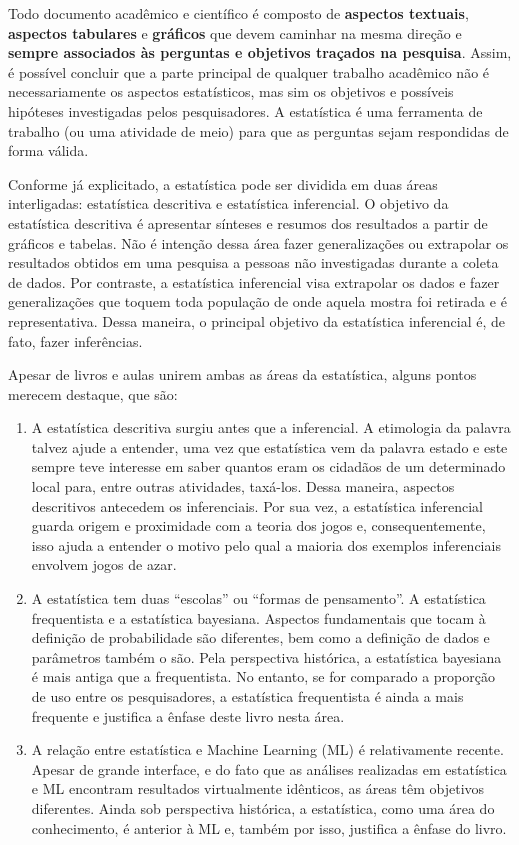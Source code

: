 \documentclass[
]{book}
\begin{document}
Todo documento acadêmico e científico é composto de \textbf{aspectos textuais}, \textbf{aspectos tabulares} e \textbf{gráficos} que devem caminhar na mesma direção e \textbf{sempre associados às perguntas e objetivos traçados na pesquisa}. Assim, é possível concluir que a parte principal de qualquer trabalho acadêmico não é necessariamente os aspectos estatísticos, mas sim os objetivos e possíveis hipóteses investigadas pelos pesquisadores. A estatística é uma ferramenta de trabalho (ou uma atividade de meio) para que as perguntas sejam respondidas de forma válida.

Conforme já explicitado, a estatística pode ser dividida em duas áreas interligadas: estatística descritiva e estatística inferencial. O objetivo da estatística descritiva é apresentar sínteses e resumos dos resultados a partir de gráficos e tabelas. Não é intenção dessa área fazer generalizações ou extrapolar os resultados obtidos em uma pesquisa a pessoas não investigadas durante a coleta de dados. Por contraste, a estatística inferencial visa extrapolar os dados e fazer generalizações que toquem toda população de onde aquela mostra foi retirada e é representativa. Dessa maneira, o principal objetivo da estatística inferencial é, de fato, fazer inferências.

Apesar de livros e aulas unirem ambas as áreas da estatística, alguns pontos merecem destaque, que são:

\begin{enumerate}
\def\labelenumi{\arabic{enumi}.}
\item
  A estatística descritiva surgiu antes que a inferencial. A etimologia da palavra talvez ajude a entender, uma vez que estatística vem da palavra estado e este sempre teve interesse em saber quantos eram os cidadãos de um determinado local para, entre outras atividades, taxá-los. Dessa maneira, aspectos descritivos antecedem os inferenciais. Por sua vez, a estatística inferencial guarda origem e proximidade com a teoria dos jogos e, consequentemente, isso ajuda a entender o motivo pelo qual a maioria dos exemplos inferenciais envolvem jogos de azar.
\item
  A estatística tem duas ``escolas'' ou ``formas de pensamento''. A estatística frequentista e a estatística bayesiana. Aspectos fundamentais que tocam à definição de probabilidade são diferentes, bem como a definição de dados e parâmetros também o são. Pela perspectiva histórica, a estatística bayesiana é mais antiga que a frequentista. No entanto, se for comparado a proporção de uso entre os pesquisadores, a estatística frequentista é ainda a mais frequente e justifica a ênfase deste livro nesta área.
\item
  A relação entre estatística e Machine Learning (ML) é relativamente recente. Apesar de grande interface, e do fato que as análises realizadas em estatística e ML encontram resultados virtualmente idênticos, as áreas têm objetivos diferentes. Ainda sob perspectiva histórica, a estatística, como uma área do conhecimento, é anterior à ML e, também por isso, justifica a ênfase do livro.
\end{enumerate}
\end{document}
